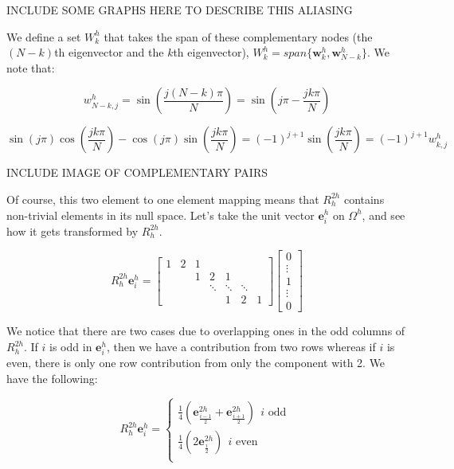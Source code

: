 \documentclass[pdftex,12pt,a4paper]{article}
\begin{document}
INCLUDE SOME GRAPHS HERE TO DESCRIBE THIS ALIASING

We define a set $W_k^h$ that takes the span of these complementary nodes (the $(N-k)$th eigenvector and the $k$th eigenvector), $W_k^h = span \{ \mathbf{w}_k^h, \mathbf{w}_{N-k}^h\}$.  We note that: 

$$
w_{N-k, j}^h = \sin \left( \frac{j (N - k) \pi}{N} \right) = \sin\left( j\pi - \frac{jk \pi}{N}\right)
$$

\begin{equation}
\sin(j \pi) \cos \left( \frac{jk \pi}{N} \right) - \cos(j \pi) \sin\left( \frac{jk \pi}{N} \right) =  (-1)^{j+1}\sin\left( \frac{jk \pi}{N} \right) = (-1)^{j+1} w_{k, j}^h
\end{equation}

INCLUDE IMAGE OF COMPLEMENTARY PAIRS

Of course, this two element to one element mapping means that $R_h^{2h}$ contains non-trivial elements in its null space.  Let's take the unit vector $\mathbf{e}_i^h$ on $\Omega^h$, and see how it gets transformed by $R_h^{2h}$.  

\begin{equation}
R_h^{2h} \mathbf{e}_i^h = \begin{bmatrix}1 & 2 & 1 \\ & &  1  & 2 & 1 \\ & & & \ddots &\ddots & \ddots \\ & & & & 1 & 2 & 1 \end{bmatrix} \begin{bmatrix} 0 \\ \vdots \\ 1 \\ \vdots \\ 0 \end{bmatrix}
\end{equation}

We notice that there are two cases due to overlapping ones in the odd columns of $R_h^{2h}$.  If $i$ is odd in $\mathbf{e}_i^h$, then we have a contribution from two rows whereas if $i$ is even, there is only one row contribution from only the component with 2.  We have the following: 

\begin{equation}
R_h^{2h} \mathbf{e}_i^h = 
    \begin{cases}
    \frac 1 4 \left( \mathbf{e}_{ \frac{i-1}{2}}^{2h} + \mathbf{e}_{\frac{i+1}{2}}^{2h} \right) ~~ i \text{ odd }\\

    \frac 1 4 \left( 2 \mathbf{e}_{\frac{i}{2}}^{2h} \right) ~~ i \text{ even }\\
    \end{cases}
\end{equation}
\end{document}
